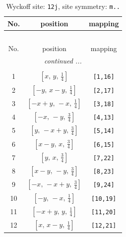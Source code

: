 \documentclass[fleqn,8pt]{jsarticle}
\begin{document}
\begin{longtable}{ccc}
\caption{Wyckoff site: {\tt 12j}, site symmetry: {\tt m..}}
 \\
 \hline \hline
No. & position & mapping \\ \hline \endfirsthead

\multicolumn{2}{l}{\tablename\ \thetable{}} \\
 \hline \hline
No. & position & mapping \\ \hline \endhead

 \hline \hline
\multicolumn{2}{r}{\footnotesize\it continued ...} \\ \endfoot

 \hline \hline
\multicolumn{2}{r}{} \\ \endlastfoot

1 & $\left[ x,\, y,\, \frac{1}{4} \right]$ & {\tt [1,16]} \\ \hline
2 & $\left[ - y,\, x - y,\, \frac{1}{4} \right]$ & {\tt [2,17]} \\ \hline
3 & $\left[ - x + y,\, - x,\, \frac{1}{4} \right]$ & {\tt [3,18]} \\ \hline
4 & $\left[ - x,\, - y,\, \frac{3}{4} \right]$ & {\tt [4,13]} \\ \hline
5 & $\left[ y,\, - x + y,\, \frac{3}{4} \right]$ & {\tt [5,14]} \\ \hline
6 & $\left[ x - y,\, x,\, \frac{3}{4} \right]$ & {\tt [6,15]} \\ \hline
7 & $\left[ y,\, x,\, \frac{3}{4} \right]$ & {\tt [7,22]} \\ \hline
8 & $\left[ x - y,\, - y,\, \frac{3}{4} \right]$ & {\tt [8,23]} \\ \hline
9 & $\left[ - x,\, - x + y,\, \frac{3}{4} \right]$ & {\tt [9,24]} \\ \hline
10 & $\left[ - y,\, - x,\, \frac{1}{4} \right]$ & {\tt [10,19]} \\ \hline
11 & $\left[ - x + y,\, y,\, \frac{1}{4} \right]$ & {\tt [11,20]} \\ \hline
12 & $\left[ x,\, x - y,\, \frac{1}{4} \right]$ & {\tt [12,21]} \\
\end{longtable}
\renewcommand{\arraystretch}{1.2}
\end{document}

